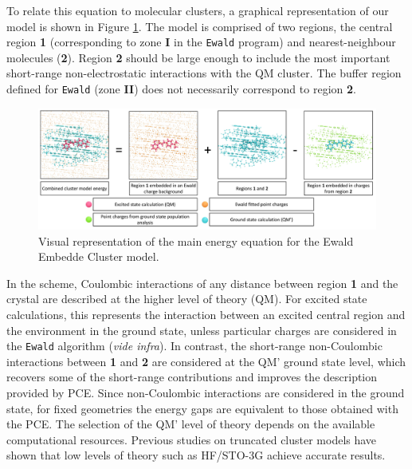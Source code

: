 To relate this equation to molecular clusters, a graphical representation of our \EEC{} model is shown in Figure \ref{fig:maineq}. The \EEC{} model is comprised of two regions, the central region \textbf{1} (corresponding to zone \textbf{I} in the \texttt{Ewald} program) and nearest-neighbour molecules (\textbf{2}). Region \textbf{2} should be large enough to include the most important short-range non-electrostatic interactions with the QM cluster. The buffer region defined for \texttt{Ewald} (zone \textbf{II}) does not necessarily correspond to region \textbf{2}.

\begin{figure}
    \centering
    \includegraphics[width=17cm]{Chapters/5Ewald/main_eq.pdf}
    \caption{Visual representation of the main energy equation for the Ewald Embedde Cluster model.}
    \label{fig:maineq}
\end{figure}

In the \EEC{} scheme, Coulombic interactions of any distance between region \textbf{1} and the crystal are described at the higher level of theory (QM). For excited state calculations, this represents the interaction between an excited central region and the environment in the ground state, unless particular charges are considered in the \texttt{Ewald} algorithm (\textit{vide infra}). In contrast, the short-range non-Coulombic interactions between \textbf{1} and \textbf{2} are considered at the QM' ground state level, which recovers some of the short-range contributions and improves the description provided by PCE. Since non-Coulombic interactions are considered in the ground state, for fixed geometries the energy gaps are equivalent to those obtained with the PCE. The selection of the QM' level of theory depends on the available computational resources. Previous studies on truncated cluster models have shown that low levels of theory such as HF/STO-3G achieve accurate results.\cite{Kochman2013,Wilbraham2016a,Presti2016a,Presti2016,Presti2017}


